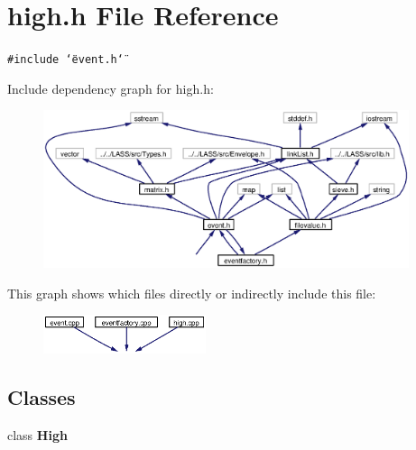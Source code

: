 \section{high.h File Reference}
\label{high_8h}
{\tt \#include \char`\"{}event.h\char`\"{}}\par


Include dependency graph for high.h:\begin{figure}[H]
\begin{center}
\leavevmode
\includegraphics[width=304pt]{high_8h__incl}
\end{center}
\end{figure}


This graph shows which files directly or indirectly include this file:\begin{figure}[H]
\begin{center}
\leavevmode
\includegraphics[width=135pt]{high_8h__dep__incl}
\end{center}
\end{figure}
\subsection*{Classes}
\begin{CompactItemize}
\item 
class {\bf High}
\end{CompactItemize}

